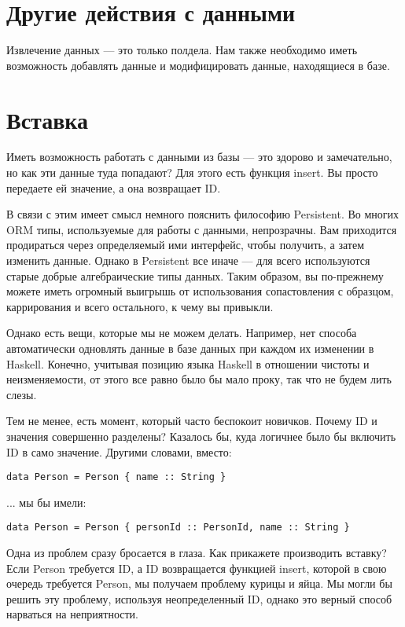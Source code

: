 \section{Другие действия с данными} %

Извлечение данных --- это только полдела. Нам также необходимо иметь возможность добавлять данные и модифицировать данные, находящиеся в базе.

\section{Вставка} %

Иметь возможность работать с данными из базы --- это здорово и замечательно, но как эти данные туда попадают? Для этого есть функция insert. Вы просто передаете ей значение, а она возвращает ID.

В связи с этим имеет смысл немного пояснить философию Persistent. Во многих ORM типы, используемые для работы с данными, непрозрачны. Вам приходится продираться через определяемый ими интерфейс, чтобы получить, а затем изменить данные. Однако в Persistent все иначе --- для всего используются старые добрые алгебраические типы данных. Таким образом, вы по-прежнему можете иметь огромный выигрышь от использования сопастовления с образцом, каррирования и всего остального, к чему вы привыкли.

Однако есть вещи, которые мы не можем делать. Например, нет способа автоматически одновлять данные в базе данных при каждом их изменении в Haskell. Конечно, учитывая позицию языка Haskell в отношении чистоты и неизменяемости, от этого все равно было бы мало проку, так что не будем лить слезы.

Тем не менее, есть момент, который часто беспокоит новичков. Почему ID и значения совершенно разделены? Казалось бы, куда логичнее было бы включить ID в само значение. Другими словами, вместо:

\begin{lstlisting}
data Person = Person { name :: String }
\end{lstlisting}

... мы бы имели:

\begin{lstlisting}
data Person = Person { personId :: PersonId, name :: String }
\end{lstlisting}

Одна из проблем сразу бросается в глаза. Как прикажете производить вставку? Если Person требуется ID, а ID возвращается функцией insert, которой в свою очередь требуется Person, мы получаем проблему курицы и яйца. Мы могли бы решить эту проблему, используя неопределенный ID, однако это верный способ нарваться на неприятности.

